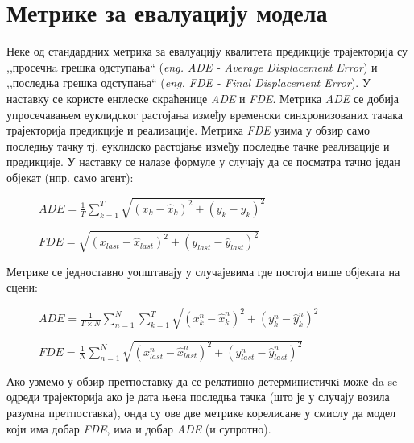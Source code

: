 \documentclass[11pt,oneside]{memoir}
\begin{document}
\chapter{Метрике за евалуацију модела}
\label{chp:razrada}

Неке од стандардних метрика за евалуацију квалитета предикције трајекторија су ,,просечнa грешка одступања`` (\textit{eng. ADE - Average Displacement Error})
и ,,последња грешка одступања`` (\textit{eng. FDE - Final Displacement Error}). У наставку се користе енглеске скраћенице \textit{ADE} и
\textit{FDE}. Метрика \textit{ADE} се добија
упросечавањем еуклидског растојања између временски синхронизованих тачака трајекторија предикције и реализације. 
Метрика \textit{FDE} узима у обзир само последњу тачку тј. еуклидско растојање између последње тачке реализације и предикције. 
\cite{social_gan} \cite{argoverse} 
У наставку се налазе формуле у случају да се посматра тачно један објекат (нпр. само агент):

\begin{figure}[H]
  \centering
  $ADE = \frac{1}{T}\sum_{k=1}^{T}\sqrt{(x_k - \hat{x}_k)^2 + (y_k - \hat{y}_k)^2}$
\end{figure}

\begin{figure}[H]
  \centering
  $FDE = \sqrt{(x_{last} - \hat{x}_{last})^2 + (y_{last} - \hat{y}_{last})^2}$
\end{figure}

Метрике се једноставно уопштавају у случајевима где постоји више објеката на сцени:

\begin{figure}[H]
  \centering
  $ADE = \frac{1}{T\times N}\sum_{n=1}^{N}\sum_{k=1}^{T}\sqrt{(x^n_k - \hat{x}^n_k)^2 + (y^n_k - \hat{y}^n_k)^2}$
\end{figure}

\begin{figure}[H]
  \centering
  $FDE = \frac{1}{N}\sum_{n=1}^{N}\sqrt{(x^n_{last} - \hat{x}^n_{last})^2 + (y^n_{last} - \hat{y}^n_{last})^2}$
\end{figure}

Ако узмемо у обзир претпоставку да се релативно детерминистичкi може da se одреди трајекторија ако је дата њена последња тачка 
(што је у случају возила разумна претпоставка), онда су ове две метрике корелисане у смислу да модел који има добар \textit{FDE}, има и добар \textit{ADE}
(и супротно).
\end{document}
